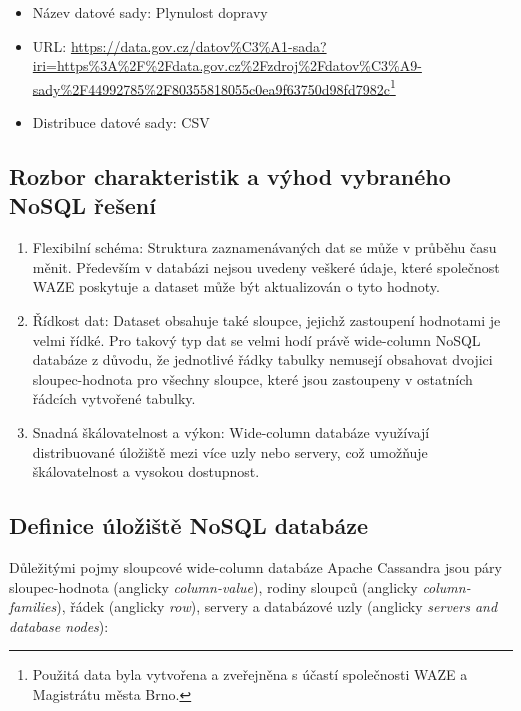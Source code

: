 \documentclass[a4paper, 11pt]{article}
\begin{document}
    \begin{itemize}
        \item Název datové sady: Plynulost dopravy
        \item URL: \url{https://data.gov.cz/datov%C3%A1-sada?iri=https%3A%2F%2Fdata.gov.cz%2Fzdroj%2Fdatov%C3%A9-sady%2F44992785%2F80355818055c0ea9f63750d98fd7982c}\footnote{Použitá data byla vytvořena a zveřejněna s účastí společnosti WAZE a Magistrátu města Brno.}
        \item Distribuce datové sady: CSV
    \end{itemize}

    \subsection{Rozbor charakteristik a výhod vybraného NoSQL řešení}

    \begin{enumerate}
        \item Flexibilní schéma: Struktura zaznamenávaných dat se může v průběhu času měnit. Především v databázi nejsou uvedeny veškeré údaje, které společnost WAZE poskytuje a dataset může být aktualizován o tyto hodnoty.
        \item Řídkost dat: Dataset obsahuje také sloupce, jejichž zastoupení hodnotami je velmi řídké. Pro takový typ dat se velmi hodí právě wide-column NoSQL databáze z důvodu, že jednotlivé řádky tabulky nemusejí obsahovat dvojici sloupec-hodnota pro všechny sloupce, které jsou zastoupeny v ostatních řádcích vytvořené tabulky.
        \item Snadná škálovatelnost a výkon: Wide-column databáze využívají distribuované úložiště mezi více uzly nebo servery, což umožňuje škálovatelnost a vysokou dostupnost.
    \end{enumerate}
    
    \subsection{Definice úložiště NoSQL databáze}
    Důležitými pojmy sloupcové wide-column databáze Apache Cassandra jsou páry sloupec-hodnota (anglicky \textit{column-value}), rodiny sloupců (anglicky \textit{column-families}), řádek (anglicky \textit{row}), servery a databázové uzly (anglicky \textit{servers and database nodes}):
\end{document}
